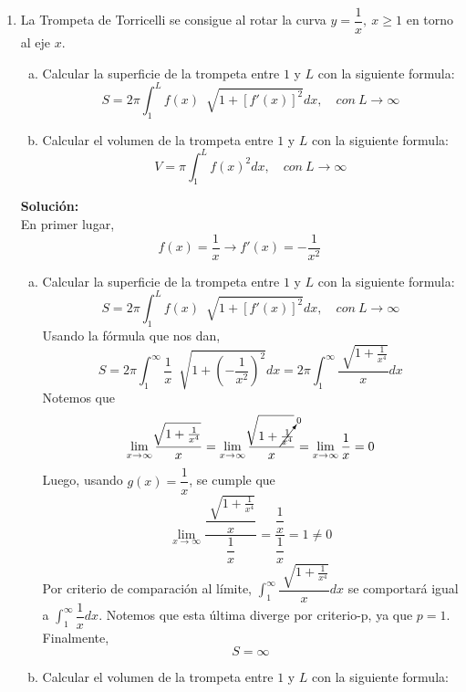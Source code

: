 \documentclass[12pt]{article}
\newenvironment{solucion}
{\begin{mdframed}[backgroundcolor=black!10]
		{\bf Solución:}\\
	}
	{
	\end{mdframed}
}
\newenvironment{preguntas}
{\begin{enumerate}\itemsep12pt
	}
	{
	\end{enumerate}
}
\newcommand{\ev}{\Big|}
\newcommand{\ra}{\rightarrow}
\begin{document}
\begin{preguntas}
\begin{solucion}
\begin{enumerate}[a)]
			$$= \lim\limits_{a\ra 0} 2arctan(\sqrt[]{x}) \ev_a^1 + \lim\limits_{a\ra \infty} 2arctan(\sqrt[]{x}) \ev_1^a$$
			$$= \lim\limits_{a\ra 0} 2(arctan(1) -arctan(\sqrt[]{a}))  + \lim\limits_{a\ra \infty} 2(arctan(\sqrt[]{a}) - arctan(1)) \ev_1^a$$
			$$= 2\left(\dfrac{\pi}{4} - 0\right) + 2\left(\dfrac{\pi}{2} - \dfrac{\pi}{4}\right)$$
			$$= \pi$$
			Por lo que la integral converge a $\pi$.
\end{enumerate}
\end{solucion}
\item La Trompeta de Torricelli se consigue al rotar la curva $y=\dfrac{1}{x},\ x \geq 1$ en torno al eje $x$.
\begin{enumerate}[a)]
\item Calcular la superficie de la trompeta entre $1$ y $L$ con la siguiente formula:
		$$ S = 2\pi \displaystyle\int_{1}^{L} f(x)\ \sqrt[]{1+[f'(x)]^2}dx, \quad con\ L \ra \infty $$
\item Calcular el volumen de la trompeta entre $1$ y $L$ con la siguiente formula:
		$$ V = \pi \displaystyle\int_{1}^{L} f(x)^2dx, \quad con\ L \ra \infty$$
\end{enumerate}
\begin{solucion}
En primer lugar,
			$$f(x) = \dfrac{1}{x} \ra f'(x) = -\dfrac{1}{x^2}$$
\begin{enumerate}[a)]
\item Calcular la superficie de la trompeta entre $1$ y $L$ con la siguiente formula:
			$$ S = 2\pi \displaystyle\int_{1}^{L} f(x)\ \sqrt[]{1+[f'(x)]^2}dx, \quad con\ L \ra \infty$$
			Usando la fórmula que nos dan,
			$$S = 2\pi \displaystyle\int_{1}^{\infty} \dfrac{1}{x}\ \sqrt[]{1+\left(-\dfrac{1}{x^2}\right)^2}dx 
			= 2\pi \displaystyle\int_{1}^{\infty} \dfrac{\sqrt[]{1+\frac{1}{x^4}}}{x}dx$$
			Notemos que
			$$\lim\limits_{x \ra \infty} \dfrac{\sqrt[]{1+\frac{1}{x^4}}}{x} = 
\lim\limits_{x \ra \infty} \dfrac{\sqrt[]{1+\cancelto{0}{\frac{1}{x^4}}}}{x} = 
\lim\limits_{x \ra \infty} \dfrac{1}{x} = 0$$
			Luego, usando $g(x) = \dfrac{1}{x}$, se cumple que
$$\lim\limits_{x \ra \infty} \dfrac{\dfrac{\sqrt[]{1+\frac{1}{x^4}}}{x}}{\dfrac{1}{x}} = 
\dfrac{\dfrac{1}{x}}{\dfrac{1}{x}} = 1 \neq 0$$
Por criterio de comparación al límite, $\displaystyle\int_{1}^{\infty} \dfrac{\sqrt[]{1+\frac{1}{x^4}}}{x}dx$ se comportará igual a $\displaystyle\int_{1}^{\infty} \dfrac{1}{x}dx$. Notemos que esta última diverge por criterio-p, ya que $p=1$.
			Finalmente,
			$$S = \infty$$
\item Calcular el volumen de la trompeta entre $1$ y $L$ con la siguiente formula:

\end{enumerate}
\end{solucion}
\end{preguntas}
\end{document}
